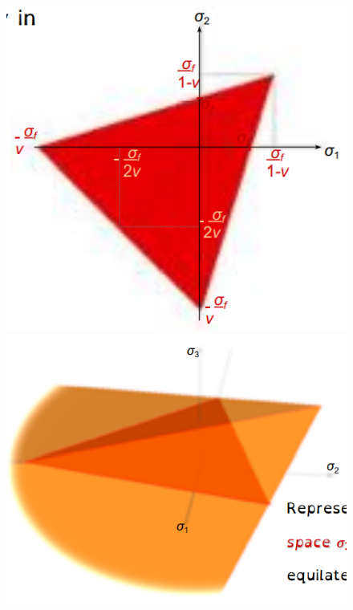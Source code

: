 \documentclass[class=report, crop=false, 12pt,a4paper]{standalone}
\begin{document}
\begin{figure}
  \begin{center}
    \begin{minipage}[b]{0.46\textwidth}
      \centering
      \includegraphics[width = \textwidth]{../img/diagram18.png}
      \caption{}
    \end{minipage}
    \begin{minipage}[b]{0.46\textwidth}
      \centering
      \includegraphics[width = \textwidth]{../img/diagram19.png}
      \caption{}
    \end{minipage}
  \end{center}
\end{figure}
\end{document}
